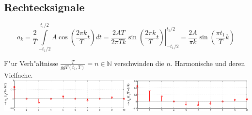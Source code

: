 	\subsection{Rechtecksignale}
	$$a_k=\frac{2}{T}\int\limits_{-t_1/2}^{t_1/2}A\cos\left(\frac{2\pi k}{T}t\right)dt=
	\left .\frac{2AT}{2\pi T k}\sin \left(\frac{2\pi k}{T}t\right)\right |_{-t_1/2}^{t_1/2}=
	\frac{2A}{\pi k}\sin\left(\frac{\pi t_1}{T}k\right)$$
	
	F"ur Verh"altnisse $\frac{T}{ggT(t_1,T)}=n\in\mathbb{N}$ verschwinden die
	$n.$ Harmonische und deren Vielfache.\\
	\includegraphics[width=19cm]{./bilder/fourierReihe/fourierreihe-rechteck.png}